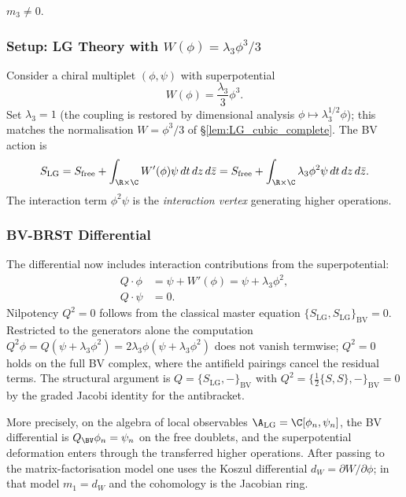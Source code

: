 $m_3 \neq 0$.

\subsubsection{Setup: LG Theory with $W(\phi) = \lambda_3 \phi^3/3$}

Consider a chiral multiplet $(\phi, \psi)$ with superpotential
\[
W(\phi) = \frac{\lambda_3}{3} \phi^3.
\]
Set $\lambda_3 = 1$ (the coupling is restored by dimensional analysis $\phi \mapsto \lambda_3^{1/2}\phi$); this matches the normalisation $W = \phi^3/3$ of \S\ref{lem:LG_cubic_complete}.
The BV action is
\[
S_{\text{LG}} = S_{\text{free}} + \int_{\R \times \C} W'(\phi) \psi \, dt \, dz \, d\bar{z} = S_{\text{free}} + \int_{\R \times \C} \lambda_3 \phi^2 \psi \, dt \, dz \, d\bar{z}.
\]
The interaction term $\phi^2 \psi$ is the \emph{interaction vertex} generating higher operations.

\subsubsection{BV-BRST Differential}

The differential now includes interaction contributions from the superpotential:
\begin{align}
Q \cdot \phi &= \psi + W'(\phi) = \psi + \lambda_3 \phi^2, \\
Q \cdot \psi &= 0.
\end{align}
Nilpotency $Q^2 = 0$ follows from the classical master equation $\{S_{\text{LG}}, S_{\text{LG}}\}_{\mathrm{BV}} = 0$. Restricted to the generators alone the computation $Q^2\phi = Q(\psi + \lambda_3\phi^2) = 2\lambda_3\phi(\psi + \lambda_3\phi^2)$ does not vanish termwise; $Q^2 = 0$ holds on the full BV complex, where the antifield pairings cancel the residual terms. The structural argument is $Q = \{S_{\mathrm{LG}}, -\}_{\mathrm{BV}}$ with $Q^2 = \{\tfrac{1}{2}\{S,S\}, -\}_{\mathrm{BV}} = 0$ by the graded Jacobi identity for the antibracket.

\begin{remark}
More precisely, on the algebra of local observables
\(\A_{\text{LG}} = \C[\phi_n, \psi_n]\), the BV differential is
\(Q_{\BV}\phi_n = \psi_n\) on the free doublets, and the
superpotential deformation enters through the transferred higher
operations. After passing to the matrix-factorisation model one uses
the Koszul differential \(d_W=\partial W/\partial\phi\); in that model
\(m_1=d_W\) and the cohomology is the Jacobian ring.
\end{remark}

